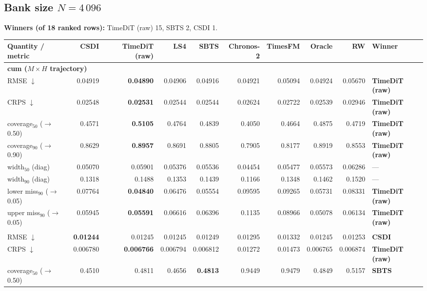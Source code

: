 \documentclass[11pt,a4paper]{article}
\begin{document}
\begin{landscape}
\section*{Bank size $N = 4\,096$}
\noindent\textbf{Winners (of 18 ranked rows):} TimeDiT (raw) 15, SBTS 2, CSDI 1.
\begin{center}\small
\begin{tabular}{lrrrrrrrrl}
\toprule
Quantity / metric & CSDI & TimeDiT (raw) & LS4 & SBTS & Chronos-2 & TimesFM & Oracle & RW & Winner \\
\midrule
\multicolumn{10}{l}{\textbf{cum ($M\times H$ trajectory)}} \\
RMSE $\downarrow$ & 0.04919 & \textbf{0.04890} & 0.04906 & 0.04916 & 0.04921 & 0.05094 & 0.04924 & 0.05670 & \textbf{TimeDiT (raw)} \\
CRPS $\downarrow$ & 0.02548 & \textbf{0.02531} & 0.02544 & 0.02544 & 0.02624 & 0.02722 & 0.02539 & 0.02946 & \textbf{TimeDiT (raw)} \\
coverage$_{50}$ ($\to$0.50) & 0.4571 & \textbf{0.5105} & 0.4764 & 0.4839 & 0.4050 & 0.4664 & 0.4875 & 0.4719 & \textbf{TimeDiT (raw)} \\
coverage$_{90}$ ($\to$0.90) & 0.8629 & \textbf{0.8957} & 0.8691 & 0.8805 & 0.7905 & 0.8177 & 0.8919 & 0.8553 & \textbf{TimeDiT (raw)} \\
width$_{50}$ (diag) & 0.05070 & 0.05901 & 0.05376 & 0.05536 & 0.04454 & 0.05477 & 0.05573 & 0.06286 & --- \\
width$_{90}$ (diag) & 0.1318 & 0.1488 & 0.1353 & 0.1439 & 0.1166 & 0.1348 & 0.1462 & 0.1520 & --- \\
lower miss$_{90}$ ($\to$0.05) & 0.07764 & \textbf{0.04840} & 0.06476 & 0.05554 & 0.09595 & 0.09265 & 0.05731 & 0.08331 & \textbf{TimeDiT (raw)} \\
upper miss$_{90}$ ($\to$0.05) & 0.05945 & \textbf{0.05591} & 0.06616 & 0.06396 & 0.1135 & 0.08966 & 0.05078 & 0.06134 & \textbf{TimeDiT (raw)} \\
\addlinespace
\multicolumn{10}{l}{\textbf{step ($M\times H$)}} \\
RMSE $\downarrow$ & \textbf{0.01244} & 0.01245 & 0.01245 & 0.01249 & 0.01295 & 0.01332 & 0.01245 & 0.01253 & \textbf{CSDI} \\
CRPS $\downarrow$ & 0.006780 & \textbf{0.006766} & 0.006794 & 0.006812 & 0.01272 & 0.01473 & 0.006765 & 0.006874 & \textbf{TimeDiT (raw)} \\
coverage$_{50}$ ($\to$0.50) & 0.4510 & 0.4811 & 0.4656 & \textbf{0.4813} & 0.9449 & 0.9479 & 0.4849 & 0.5157 & \textbf{SBTS} \\

\end{tabular}
\end{center}
\end{landscape}
\end{document}
